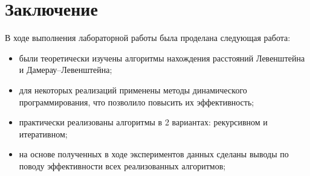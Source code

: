 \chapter*{Заключение}

В ходе выполнения лабораторной работы была проделана следующая работа:

\begin{itemize}
    \item были теоретически изучены алгоритмы нахождения расстояний Левенштейна и Дамерау--Левенштейна;
	\item для некоторых реализаций применены методы динамического программирования, что позволило повысить их эффективность;
	\item практически реализованы алгоритмы в 2 вариантах: рекурсивном и итеративном;
	\item на основе полученных в ходе экспериментов данных сделаны выводы по поводу эффективности всех реализованных алгоритмов;
\end{itemize}